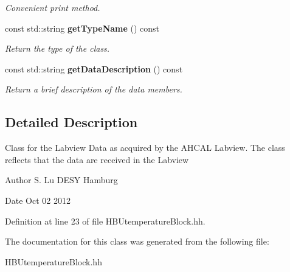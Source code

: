 \begin{DoxyCompactItemize}
\begin{DoxyCompactList}\small\item\em Convenient print method. \item\end{DoxyCompactList}\item 
const std::string {\bf getTypeName} () const \label{classCALICE_1_1HBUTemperatureBlock_ab15e48bcf14a740d241ec60e3ee03677}

\begin{DoxyCompactList}\small\item\em Return the type of the class. \item\end{DoxyCompactList}\item 
const std::string {\bf getDataDescription} () const \label{classCALICE_1_1HBUTemperatureBlock_ae010246fa7084166bee5a5bcb83957c0}

\begin{DoxyCompactList}\small\item\em Return a brief description of the data members. \item\end{DoxyCompactList}\end{DoxyCompactItemize}


\subsection{Detailed Description}
Class for the Labview Data as acquired by the AHCAL Labview. The class reflects that the data are received in the Labview \begin{DoxyAuthor}{Author}
S. Lu DESY Hamburg 
\end{DoxyAuthor}
\begin{DoxyDate}{Date}
Oct 02 2012 
\end{DoxyDate}


Definition at line 23 of file HBUtemperatureBlock.hh.

The documentation for this class was generated from the following file:\begin{DoxyCompactItemize}
\item 
HBUtemperatureBlock.hh\end{DoxyCompactItemize}
